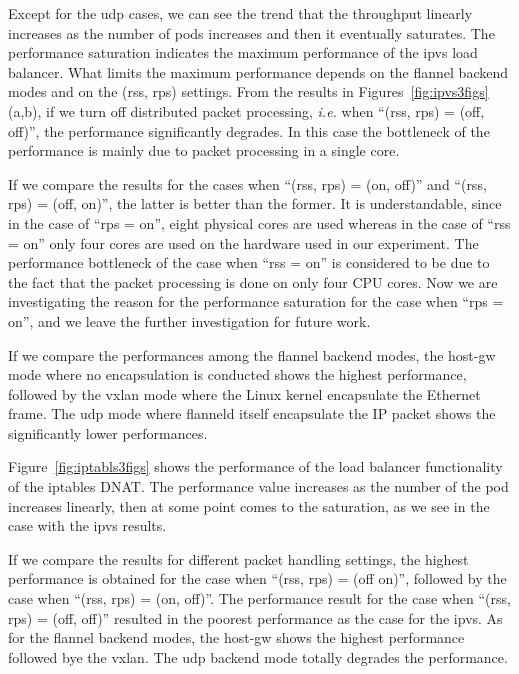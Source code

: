 Except for the udp cases, we can see the trend that the throughput linearly increases 
as the number of pods increases and then it eventually saturates.
The performance saturation indicates the maximum performance of the ipvs load balancer.
What limits the maximum performance depends on the flannel backend modes and on the (rss, rps) settings.
From the results in Figures~\ref{fig:ipvs3figs}(a,b), if we turn off distributed packet processing,
{\it i.e.} when \enquote{(rss, rps) = (off, off)}, the performance significantly degrades. 
In this case the bottleneck of the performance is mainly due to packet processing in a single core.

If we compare the results for the cases when \enquote{(rss, rps) = (on, off)} and \enquote{(rss, rps) = (off, on)},
the latter is better than the former.
It is understandable, since in the case of \enquote{rps = on}, eight physical cores are used whereas 
in the case of \enquote{rss = on} only four cores are used on the hardware used in our experiment.
The performance bottleneck of the case when \enquote{rss = on} is considered 
to be due to the fact that the packet processing is done on only four CPU cores.
Now we are investigating the reason for the performance saturation for the case when \enquote{rps = on}, 
and we leave the further investigation for future work.

If we compare the performances among the flannel backend modes, 
the host-gw mode where no encapsulation is conducted shows the highest performance,
followed by the vxlan mode where the Linux kernel encapsulate the Ethernet frame.
The udp mode where flanneld itself encapsulate the IP packet shows the significantly lower performances.

Figure~\ref{fig:iptabls3figs} shows the performance of the load balancer 
functionality of the iptables DNAT. 
The performance value increases as the number of the pod increases linearly, 
then at some point comes to the saturation, as we see in the case with the ipvs results.

If we compare the results for different packet handling settings, the highest performance is 
obtained for the case when \enquote{(rss, rps) = (off on)}, followed by the case when \enquote{(rss, rps) = (on, off)}. 
The performance result for the case when \enquote{(rss, rps) = (off, off)} resulted in the 
poorest performance as the case for the ipvs.
As for the flannel backend modes, the host-gw shows the highest performance followed 
bye the vxlan. The udp backend mode totally degrades the performance.

